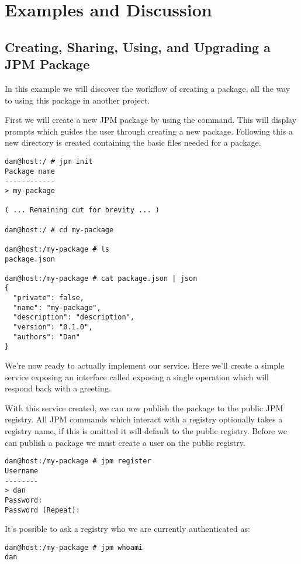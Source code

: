 \section{Examples and Discussion}

\subsection{Creating, Sharing, Using, and Upgrading a JPM Package}

In this example we will discover the workflow of creating a package, all the
way to using this package in another project.

First we will create a new JPM package by using the  command.
This will display prompts which guides the user through creating a new package.
Following this a new directory is created containing the basic files needed for
a package.

\begin{verbatim}
dan@host:/ # jpm init
Package name
------------
> my-package

( ... Remaining cut for brevity ... )

dan@host:/ # cd my-package

dan@host:/my-package # ls
package.json

dan@host:/my-package # cat package.json | json
{
  "private": false,
  "name": "my-package",
  "description": "description",
  "version": "0.1.0",
  "authors": "Dan"
}
\end{verbatim}

We're now ready to actually implement our service. Here we'll create a simple
service exposing an interface called  exposing a
single operation  which will respond back with a
greeting.

With this service created, we can now publish the package to the public JPM
registry. All JPM commands which interact with a registry optionally takes a
registry name, if this is omitted it will default to the public registry.
Before we can publish a package we must create a user on the public registry.

\begin{verbatim}
dan@host:/my-package # jpm register
Username
--------
> dan
Password:
Password (Repeat):
\end{verbatim}

It's possible to ask a registry who we are currently authenticated as:

\begin{verbatim}
dan@host:/my-package # jpm whoami
dan
\end{verbatim}


